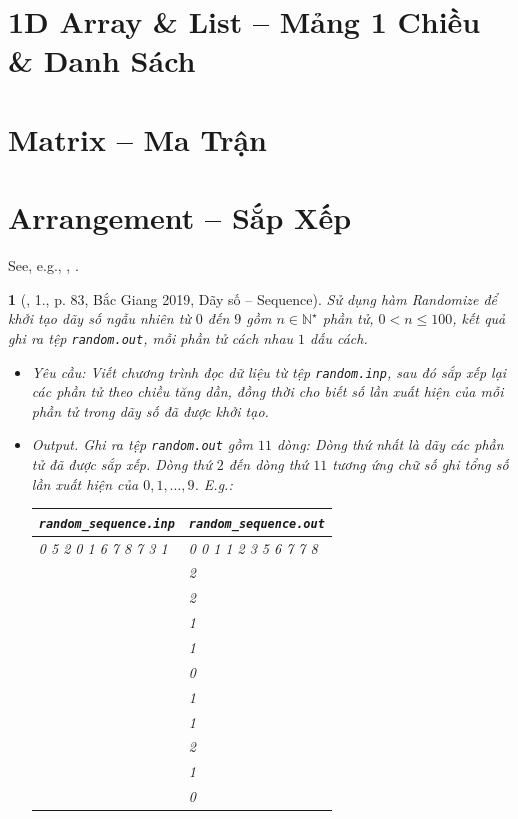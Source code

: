 \documentclass{article}
\newtheorem{baitoan}{}
\begin{document}

\section{1D Array \& List -- Mảng 1 Chiều \& Danh Sách}


\section{Matrix -- Ma Trận}


\section{Arrangement -- Sắp Xếp}
See, e.g., \cite[Chap. 5: Sorting]{Knuth1998}, \cite[Chap. II, Sect. Dạng bài sắp xếp]{VietSTEM2021}.

\begin{baitoan}[\cite{VietSTEM2021}, 1., p. 83, Bắc Giang 2019, Dãy số -- Sequence]
	Sử dụng hàm Randomize để khởi tạo dãy số ngẫu nhiên từ $0$ đến $9$ gồm $n\in\mathbb{N}^\star$ phần tử, $0 < n\le100$, kết quả ghi ra tệp \verb|random.out|, mỗi phần tử cách nhau $1$ dấu cách.
	\begin{itemize}
		\item {\sf Yêu cầu:} Viết chương trình đọc dữ liệu từ tệp \verb|random.inp|, sau đó sắp xếp lại các phần tử theo chiều tăng dần, đồng thời cho biết số lần xuất hiện của mỗi phần tử trong dãy số đã được khởi tạo.
		\item {\sf Output.} Ghi ra tệp \verb|random.out| gồm $11$ dòng: Dòng thứ nhất là dãy các phần tử đã được sắp xếp. Dòng thứ $2$ đến dòng thứ $11$ tương ứng chữ số ghi tổng số lần xuất hiện của $0,1,\ldots,9$. E.g.:
		\begin{table}[H]
			\centering
			\begin{tabular}{|l|l|}
				\hline
				\verb|random_sequence.inp| & \verb|random_sequence.out| \\
				\hline
				0 5 2 0 1 6 7 8 7 3 1 & 0 0 1 1 2 3 5 6 7 7 8 \\
				& 2 \\
				& 2 \\
				& 1 \\
				& 1 \\
				& 0 \\
				& 1 \\
				& 1 \\
				& 2 \\
				& 1 \\
				& 0 \\
				\hline
			\end{tabular}
		\end{table}
	\end{itemize}
\end{baitoan}
\end{document}
